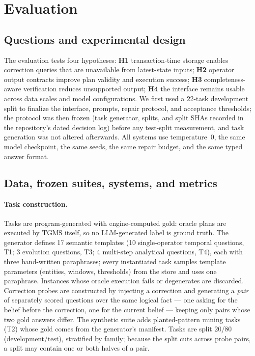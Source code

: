 \documentclass[11pt]{article}
\begin{document}
\section{Evaluation}
\label{sec:eval}

\subsection{Questions and experimental design}
The evaluation tests four hypotheses:
\textbf{H1} transaction-time storage enables correction queries that are
unavailable from latest-state inputs;
\textbf{H2} operator output contracts improve plan validity and
execution success;
\textbf{H3} completeness-aware verification reduces unsupported output;
\textbf{H4} the interface remains usable across data scales and model
configurations.
We first used a 22-task development split to finalize the interface,
prompts, repair protocol, and acceptance thresholds; the protocol was
then frozen (task generator, splits, and split SHAs recorded in the
repository's dated decision log) before any test-split measurement, and
task generation was not altered afterwards. All systems use
temperature~0, the same model checkpoint, the same seeds, the same
repair budget, and the same typed answer format.

\subsection{Data, frozen suites, systems, and metrics}
\label{sec:setup}

\paragraph{Task construction.}
Tasks are program-generated with engine-computed gold: oracle plans are
executed by TGMS itself, so no LLM-generated label is ground truth. The
generator defines 17 semantic templates (10 single-operator temporal
questions, T1; 3 evolution questions, T3; 4 multi-step analytical
questions, T4), each with three hand-written paraphrases; every
instantiated task samples template parameters (entities, windows,
thresholds) from the store and uses one paraphrase. Instances whose
oracle execution fails or degenerates are discarded. Correction probes
are constructed by injecting a correction and generating a
\emph{pair} of separately scored questions over the same logical fact
--- one asking for the belief before the correction, one for the
current belief --- keeping only pairs whose two gold answers differ.
The synthetic suite adds planted-pattern mining tasks (T2) whose gold
comes from the generator's manifest. Tasks are split 20/80
(development/test), stratified by family; because the split cuts
across probe pairs, a split may contain one or both halves of a pair.
\end{document}
